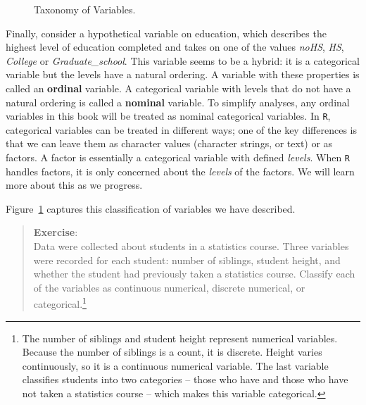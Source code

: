 \documentclass[
  letterpaper,
  DIV=11,
  numbers=noendperiod]{scrreprt}
\begin{document}
\begin{figure}


\caption{\label{fig-tax}Taxonomy of Variables.}

\end{figure}%

Finally, consider a hypothetical variable on education, which describes
the highest level of education completed and takes on one of the values
\emph{noHS}, \emph{HS}, \emph{College} or \emph{Graduate\_school}. This
variable seems to be a hybrid: it is a categorical variable but the
levels have a natural ordering. A variable with these properties is
called an \textbf{ordinal} variable. A categorical variable with levels
that do not have a natural ordering is called a \textbf{nominal}
variable. To simplify analyses, any ordinal variables in this book will
be treated as nominal categorical variables. In \texttt{R}, categorical
variables can be treated in different ways; one of the key differences
is that we can leave them as character values (character strings, or
text) or as factors. A factor is essentially a categorical variable with
defined \emph{levels}. When \texttt{R} handles factors, it is only
concerned about the \emph{levels} of the factors. We will learn more
about this as we progress.

Figure~\ref{fig-tax} captures this classification of variables we have
described.

\begin{quote}
\textbf{Exercise}:\\
Data were collected about students in a statistics course. Three
variables were recorded for each student: number of siblings, student
height, and whether the student had previously taken a statistics
course. Classify each of the variables as continuous numerical, discrete
numerical, or categorical.\footnote{The number of siblings and student
  height represent numerical variables. Because the number of siblings
  is a count, it is discrete. Height varies continuously, so it is a
  continuous numerical variable. The last variable classifies students
  into two categories -- those who have and those who have not taken a
  statistics course -- which makes this variable categorical.}
\end{quote}
\end{document}
